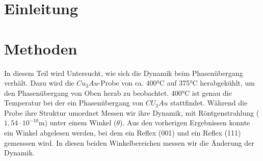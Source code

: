 \section{Einleitung}
\section{Methoden}
In diesem Teil wird Untersucht, wie sich die Dynamik beim Phasenübergang verhält. Dazu wird die $Cu_3Au$-Probe von ca. 400°C auf 375°C herabgekühlt, um den Phasenübergang von Oben herab zu beobachtet. 400°C ist genau die Temperatur bei der ein Phasenübergang von $CU_3Au$ stattfindet. Während die Probe ihre Struktur umordnet Messen wir ihre Dynamik, mit Röntgenstrahlung ($1,54 \cdot 10^{-10}$m) unter einem Winkel ($\theta$). Aus den vorherigen Ergebnissen konnte ein Winkel abgelesen werden,
bei dem ein Reflex (001) und ein Reflex (111) gemesssen wird. In diesen beiden Winkelbereichen messen wir die Änderung der Dynamik.
